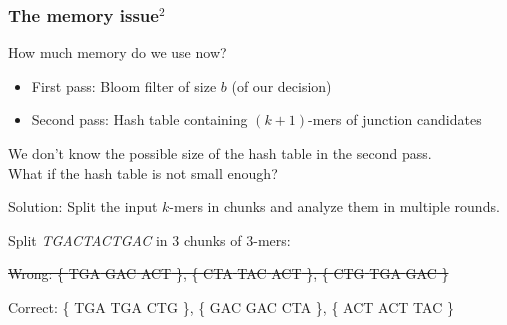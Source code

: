 \begin{frame}
	\frametitle{The memory issue$^{2}$}
	\centering
	
	How much memory do we use now?
	
	\medskip
	
	\begin{itemize}
	  \item First pass: Bloom filter of size $b$ (of our decision)
	  \item Second pass: Hash table containing $(k+1)$-mers of junction candidates
	\end{itemize}

	\medskip
	
	We don't know the possible size of the hash table in the second pass. \\
	What if the hash table is not small enough?
  
	\medskip

  Solution: Split the input $k$-mers in chunks and analyze them in multiple rounds.

  \medskip
  
  Split \textit{TGACTACTGAC} in $3$ chunks of $3$-mers: \\
  
  \medskip
  
  \st{
  Wrong: \{
    {\color{red}TGA} 
    {\color{blue}GAC}
    {\color{pink}ACT}
  \}, 
  \{
    {\color{green}CTA} 
    {\color{darkgreen}TAC}
    {\color{pink}ACT}
  \}, 
  \{
    {\color{orange}CTG} 
    {\color{red}TGA} 
    {\color{blue}GAC}
  \}
  }
  
  \medskip
  
  Correct: \{
    {\color{red}TGA} 
    {\color{red}TGA} 
    {\color{orange}CTG} 
  \}, 
  \{
    {\color{blue}GAC}
    {\color{blue}GAC}
    {\color{green}CTA} 
  \}, 
  \{
    {\color{pink}ACT}
    {\color{pink}ACT}
    {\color{darkgreen}TAC} 
  \}  
\end{frame}


